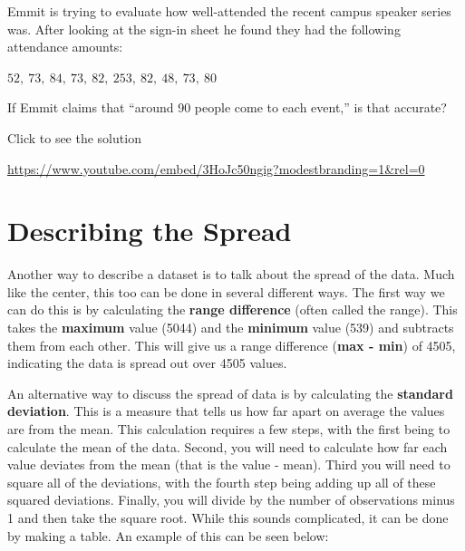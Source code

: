 \documentclass[
  letterpaper,
  DIV=11,
  numbers=noendperiod]{scrreprt}
\begin{document}
\begin{tcolorbox}[enhanced jigsaw, leftrule=.75mm, arc=.35mm, coltitle=black, rightrule=.15mm, bottomrule=.15mm, toprule=.15mm, left=2mm, colbacktitle=quarto-callout-tip-color!10!white, title=\textcolor{quarto-callout-tip-color}{\faLightbulb}\hspace{0.5em}{Try it Out}, toptitle=1mm, breakable, colframe=quarto-callout-tip-color-frame, bottomtitle=1mm, titlerule=0mm, colback=white, opacityback=0, opacitybacktitle=0.6]

Emmit is trying to evaluate how well-attended the recent campus speaker
series was. After looking at the sign-in sheet he found they had the
following attendance amounts:

\(52,\ 73,\ 84,\ 73,\ 82,\ 253,\ 82,\ 48,\ 73,\ 80\)

If Emmit claims that ``around 90 people come to each event,'' is that
accurate?

Click to see the solution

\url{https://www.youtube.com/embed/3HoJc50ngig?modestbranding=1&rel=0}

\end{tcolorbox}

\section{Describing the Spread}\label{describing-the-spread}

Another way to describe a dataset is to talk about the spread of the
data. Much like the center, this too can be done in several different
ways. The first way we can do this is by calculating the \textbf{range
difference} (often called the range). This takes the \textbf{maximum}
value (5044) and the \textbf{minimum} value (539) and subtracts them
from each other. This will give us a range difference (\textbf{max -
min}) of 4505, indicating the data is spread out over 4505 values.

An alternative way to discuss the spread of data is by calculating the
\textbf{standard deviation}. This is a measure that tells us how far
apart on average the values are from the mean. This calculation requires
a few steps, with the first being to calculate the mean of the data.
Second, you will need to calculate how far each value deviates from the
mean (that is the value - mean). Third you will need to square all of
the deviations, with the fourth step being adding up all of these
squared deviations. Finally, you will divide by the number of
observations minus 1 and then take the square root. While this sounds
complicated, it can be done by making a table. An example of this can be
seen below:
\end{document}
